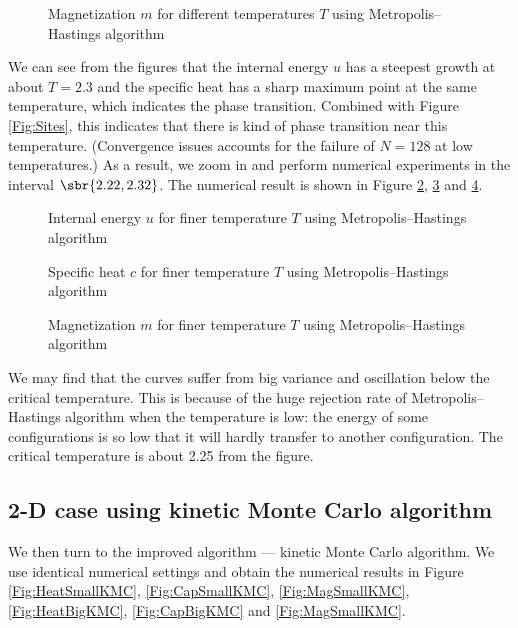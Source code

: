 \documentclass[english, nochinese]{pnote}
\begin{document}
\begin{figure}[htbp]
\centering
\scalebox{0.666}{}
\caption{Magnetization $m$ for different temperatures $T$ using Metropolis--Hastings algorithm}
\label{Fig:MagSmall}
\end{figure}

We can see from the figures that the internal energy $u$ has a steepest growth at about $ T = 2.3 $ and the specific heat has a sharp maximum point at the same temperature, which indicates the phase transition. Combined with Figure \ref{Fig:Sites}, this indicates that there is kind of phase transition near this temperature. (Convergence issues accounts for the failure of $ N = 128 $ at low temperatures.) As a result, we zoom in and perform numerical experiments in the interval $ \sbr{ 2.22, 2.32 } $. The numerical result is shown in Figure \ref{Fig:HeatBig}, \ref{Fig:CapBig} and \ref{Fig:MagBig}.

\begin{figure}[htbp]
\centering
\scalebox{0.666}{}
\caption{Internal energy $u$ for finer temperature $T$ using Metropolis--Hastings algorithm}
\label{Fig:HeatBig}
\end{figure}

\begin{figure}[htbp]
\centering
\scalebox{0.666}{}
\caption{Specific heat $c$ for finer temperature $T$ using Metropolis--Hastings algorithm}
\label{Fig:CapBig}
\end{figure}

\begin{figure}[htbp]
\centering
\scalebox{0.666}{}
\caption{Magnetization $m$ for finer temperature $T$ using Metropolis--Hastings algorithm}
\label{Fig:MagBig}
\end{figure}

We may find that the curves suffer from big variance and oscillation below the critical temperature. This is because of the huge rejection rate of Metropolis--Hastings algorithm when the temperature is low: the energy of some configurations is so low that it will hardly transfer to another configuration. The critical temperature is about 2.25 from the figure.

\subsection{2-D case using kinetic Monte Carlo algorithm}

We then turn to the improved algorithm --- kinetic Monte Carlo algorithm. We use identical numerical settings and obtain the numerical results in Figure \ref{Fig:HeatSmallKMC}, \ref{Fig:CapSmallKMC}, \ref{Fig:MagSmallKMC}, \ref{Fig:HeatBigKMC}, \ref{Fig:CapBigKMC} and \ref{Fig:MagSmallKMC}.
\end{document}
